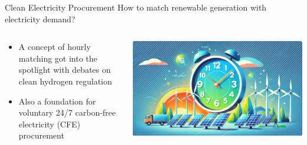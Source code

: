 \begin{frame}{Clean Electricity Procurement}
	\vspace{-1cm}
	\centering
	How to \alert{match} renewable generation with electricity demand?
	\vspace{0.5cm}
	  \begin{columns}
		\begin{column}{0.4\textwidth}
		\begin{itemize}
			\item A concept of \alert{hourly matching} got into the spotlight with debates on clean hydrogen regulation
			\item Also a foundation for voluntary 24/7 carbon-free electricity (CFE) procurement  
		\end{itemize}      
		\end{column}
		\begin{column}{0.6\textwidth}
			\includegraphics[width=1\linewidth]{images/hourly_electricity_procurement_v2}  
		\end{column}
	\end{columns}
\end{frame}

